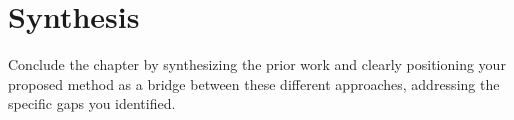 \section{Synthesis}

\begin{outline}
  Conclude the chapter by synthesizing the prior work and clearly positioning your proposed method as a bridge between these different approaches, addressing the specific gaps you identified.
\end{outline}
